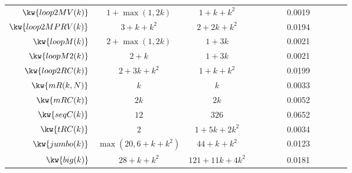 {\begin {table}[H]
\begin{center}
{\begin{tabular}{ | >{\tiny}r | c | c | c | c | c | c | c | c | c | c | c |}
         $  \kw{loop2MV(k)}$  & $1 + \max(1,2k) $ &  $1 + k + k^2 $  & & & & & 0.0019 & & \\
         $ \kw{loop2MPRV(k)}$  &  $3 + k + k^2  $ &  $2 + 2k + k^2  $  &  & & & & 0.0194 & & \\
         {$ \kw{loopM(k)}$}  &  $ 2 + \max(1,2k) $ & $1 + 3k  $  &  & & & & 0.0021 & \\
         {$ \kw{loopM2(k)}$}  &  $ 2 + k $ & $1 + 3k  $  &  & & & & 0.0021 & & \\
         {$\kw{loop2RC(k)}$}&  $2 + 3k + k^2$ &  $1 + k + k^2$  &  & & & & 0.0199 & & \\
         $  \kw{mR(k, N)}$ & $ k   $ & $k $   &  & & & & 0.0033 & & \\
         $  \kw{mRC(k)}$  & $  2k $ & $ 2k $   &  & & & & 0.0052 & & \\
         $  \kw{seqC(k)}$ & $12  $  & $326 $  &  & & & & 0.0652 & & \\
         $  \kw{tRC(k)}$ &  $ 2$ & $ 1 + 5k + 2 k^2 $  &  & & & & 0.0034 &  & \\
         $  \kw{{jumbo(k)}}$ & $  \max(20, 6+k+k^2)$   &   $ {44+k+k^2} $  &  & & & & 0.0123 &  & \\
         $  {\kw{big(k)}} $ &   $28 + k + k^2$ &  $121+11k+4k^2 $  &  & & & & 0.0181 & & \\
        \hline \hline 
        \end{tabular}
}
\end{center}
\end{table}
}


